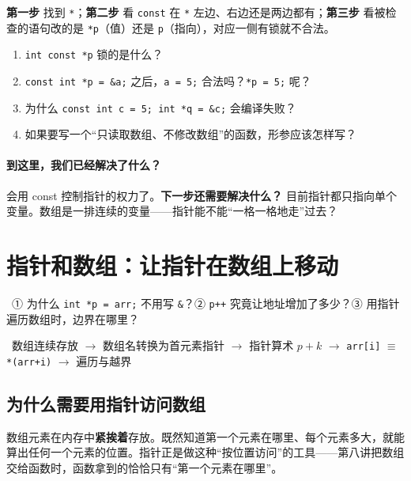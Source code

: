 \documentclass[UTF8,a4paper,11pt,fontset=none,zihao=-4]{ctexart}
\newcommand{\ci}[1]{{\circfont #1}}
\newcommand{\cc}[1]{\texttt{#1}}
\begin{document}
\begin{summarybox}
\textbf{第一步} 找到 \cc{*}；\textbf{第二步} 看 \cc{const} 在 \cc{*} 左边、右边还是两边都有；\textbf{第三步} 看被检查的语句改的是 \cc{*p}（值）还是 \cc{p}（指向），对应一侧有锁就不合法。
\end{summarybox}

\begin{checkbox}
\begin{enumerate}[label=\arabic*.,itemsep=0pt]
  \item \cc{int const *p} 锁的是什么？
  \item \cc{const int *p = \&a;} 之后，\cc{a = 5;} 合法吗？\cc{*p = 5;} 呢？
  \item 为什么 \cc{const int c = 5; int *q = \&c;} 会编译失败？
  \item 如果要写一个“只读取数组、不修改数组”的函数，形参应该怎样写？
\end{enumerate}
\end{checkbox}

\paragraph{到这里，我们已经解决了什么？} 会用 const 控制指针的权力了。\textbf{下一步还需要解决什么？} 目前指针都只指向单个变量。数组是一排连续的变量——指针能不能“一格一格地走”过去？

\section{指针和数组：让指针在数组上移动}\label{sec:arr}
\ \ci{①} 为什么 \cc{int *p = arr;} 不用写 \cc{\&}？\ci{②} \cc{p++} 究竟让地址增加了多少？\ci{③} 用指针遍历数组时，边界在哪里？\par
{}\ 数组连续存放 $\to$ 数组名转换为首元素指针 $\to$ 指针算术 $p+k$ $\to$ \cc{arr[i]} $\equiv$ \cc{*(arr+i)} $\to$ 遍历与越界

\subsection{为什么需要用指针访问数组}
数组元素在内存中\textbf{紧挨着}存放。既然知道第一个元素在哪里、每个元素多大，就能算出任何一个元素的位置。指针正是做这种“按位置访问”的工具——第八讲把数组交给函数时，函数拿到的恰恰只有“第一个元素在哪里”。
\end{document}
